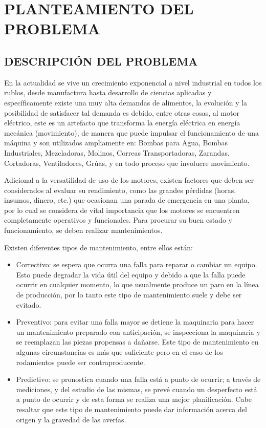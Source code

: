 \thispagestyle{empty}
\setcounter{page}{5}

\section{PLANTEAMIENTO DEL PROBLEMA}

\subsection{DESCRIPCIÓN DEL PROBLEMA}

En la actualidad se vive un crecimiento exponencial a nivel industrial en todos
los rublos, desde manufactura hasta desarrollo de ciencias aplicadas y específicamente
existe una muy alta demandas de alimentos, la evolución y la posibilidad de
satisfacer tal demanda es debido, entre
otras cosas, al motor eléctrico, este es un artefacto que transforma la
energía eléctrica en energía mecánica (movimiento), de manera que puede
impulsar el funcionamiento de una máquina y son utilizados ampliamente en:
Bombas para Agua, Bombas Industriales, Mezcladoras, Molinos, Correas
Transportadoras, Zarandas, Cortadoras, Ventiladores, Grúas, y en todo proceso
que involucre movimiento.

Adicional a la versatilidad de uso de los motores, existen factores que deben ser
considerados al evaluar su rendimiento, como las grandes pérdidas
(horas, insumos, dinero, etc.) que ocasionan una parada
de emergencia en una planta, por lo cual se considera de vital importancia que
los motores se encuentren completamente operativos y funcionales. Para
procurar su buen estado y funcionamiento, se deben realizar mantenimientos.

Existen diferentes tipos de mantenimiento, entre ellos están:
\begin{itemize}

\item{Correctivo: se espera que ocurra una falla para reparar o cambiar un
    equipo. Esto puede degradar la vida útil del equipo y debido a que la falla
        puede ocurrir en cualquier momento, lo que usualmente produce un paro en la
        línea de producción, por lo tanto este tipo de mantenimiento suele y
        debe ser evitado.}

\item{Preventivo: para evitar una falla mayor se detiene la maquinaria para
    hacer un mantenimiento preparado con anticipación, se inspecciona la
        maquinaria y se reemplazan las piezas propensas a dañarse. Este tipo de
        mantenimiento en algunas circunstancias es más que suficiente pero en
        el caso de los rodamientos puede ser contraproducente.}

\item{Predictivo: se pronostica cuando una falla está a punto de ocurrir; a
    través de mediciones, y del estudio de las mismas, se prevé cuando un
        desperfecto está a punto de ocurrir y de esta forma se realiza una
        mejor planificación. Cabe resaltar que este tipo de mantenimiento puede
        dar información acerca del origen y la gravedad de las averías.}

\end{itemize}

